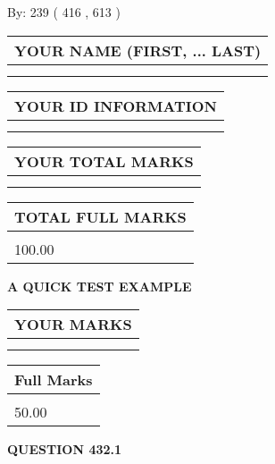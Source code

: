 \documentclass[12pt]{article}
\begin{document}
   
\hspace{1.0in} By: 
 239 ( 416 ,  613 )
   
   
   
   
\newpage 
\setcounter{page}{ 
   432001 } 
   
   
   
   
\noindent\begin{tabular}{|l|}
\hline
YOUR NAME (FIRST, ... LAST)  \\
\hline
 \\ 
 \\ 
\hline
\end{tabular}
\hspace{0.05in} \begin{tabular}{|l|}
\hline
 YOUR   ID   INFORMATION  \\
\hline
 \\ 
 \\ 
\hline
\end{tabular}
   
   
\vspace{0.2in}\noindent\begin{tabular}{|l|}
\hline
YOUR TOTAL MARKS  \\
\hline
 \\ 
 \\ 
\hline
\end{tabular}
\hspace{0.05in} \begin{tabular}{|l|}
\hline
TOTAL FULL MARKS  \\
\hline
 \\ 
100.00 \\
\hline
\end{tabular}
   
   
 \vspace{0.2in}
{\LARGE {\textbf{ A QUICK TEST EXAMPLE}}}
   
   
  
\vspace{0.2in}
  
\noindent\begin{tabular}{|l|}
\hline
 YOUR MARKS  \\
\hline
 \\ 
 \\ 
\hline
\end{tabular}
\hspace{0.05in} \begin{tabular}{|l|}
\hline
 Full Marks  \\
\hline
 \\ 
50.00 \\
\hline
\end{tabular}
{\textbf{\Large{QUESTION
432.1 
}}}
  
\end{document}
